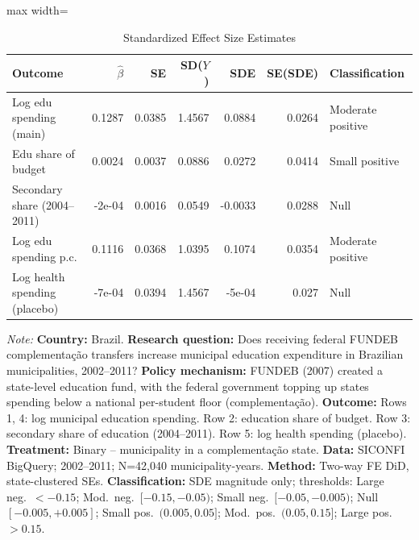 \begin{table}[!h]
\centering
\caption{\label{tab:sde}Standardized Effect Size Estimates}
\begin{adjustbox}{max width=\textwidth}
\begin{threeparttable}
\begin{tabular}{lrrrrrp{4cm}}
\toprule
Outcome & $\hat{\beta}$ & SE & SD($Y$) & SDE & SE(SDE) & Classification \\
\midrule
Log edu spending (main) & 0.1287 & 0.0385 & 1.4567 & 0.0884 & 0.0264 & Moderate positive \\
Edu share of budget & 0.0024 & 0.0037 & 0.0886 & 0.0272 & 0.0414 & Small positive \\
Secondary share (2004--2011) & -2e-04 & 0.0016 & 0.0549 & -0.0033 & 0.0288 & Null \\
Log edu spending p.c. & 0.1116 & 0.0368 & 1.0395 & 0.1074 & 0.0354 & Moderate positive \\
Log health spending (placebo) & -7e-04 & 0.0394 & 1.4567 & -5e-04 & 0.027 & Null \\
\bottomrule
\end{tabular}
\begin{tablenotes}
\small
\item \textit{Note:} \textbf{Country:} Brazil. \textbf{Research question:} Does receiving federal FUNDEB complementa\c{c}\~ao transfers increase municipal education expenditure in Brazilian municipalities, 2002--2011? \textbf{Policy mechanism:} FUNDEB (2007) created a state-level education fund, with the federal government topping up states spending below a national per-student floor (complementa\c{c}\~ao). \textbf{Outcome:} Rows 1, 4: log municipal education spending. Row 2: education share of budget. Row 3: secondary share of education (2004--2011). Row 5: log health spending (placebo). \textbf{Treatment:} Binary -- municipality in a complementa\c{c}\~ao state. \textbf{Data:} SICONFI BigQuery; 2002--2011; N=42,040 municipality-years. \textbf{Method:} Two-way FE DiD, state-clustered SEs. \textbf{Classification:} SDE magnitude only; thresholds: Large neg.~$<{-}0.15$; Mod.\ neg.~$[{-}0.15,{-}0.05)$; Small neg.~$[{-}0.05,{-}0.005)$; Null~$[{-}0.005,{+}0.005]$; Small pos.~$(0.005,0.05]$; Mod.\ pos.~$(0.05,0.15]$; Large pos.~$>0.15$.
\end{tablenotes}
\end{threeparttable}
\end{adjustbox}
\end{table}
